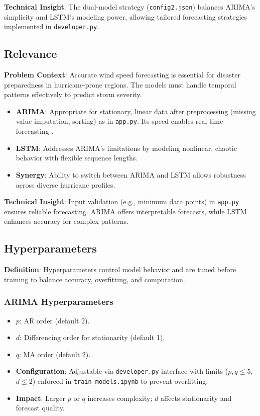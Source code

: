 \textbf{Technical Insight}: The dual-model strategy (\texttt{config2.json}) balances ARIMA’s simplicity and LSTM’s modeling power, allowing tailored forecasting strategies implemented in \texttt{developer.py}.

\subsection{Relevance}

\textbf{Problem Context}: Accurate wind speed forecasting is essential for disaster preparedness in hurricane-prone regions. The models must handle temporal patterns effectively to predict storm severity.

\begin{itemize}
	\item \textbf{ARIMA}: Appropriate for stationary, linear data after preprocessing (missing value imputation, sorting) as in \texttt{app.py}. Its speed enables real-time forecasting \cite{HyndmanAthanasopoulos2021}.
	\item \textbf{LSTM}: Addresses ARIMA’s limitations by modeling nonlinear, chaotic behavior with flexible sequence lengths.
	\item \textbf{Synergy}: Ability to switch between ARIMA and LSTM allows robustness across diverse hurricane profiles.
\end{itemize}

\textbf{Technical Insight}: Input validation (e.g., minimum data points) in \texttt{app.py} ensures reliable forecasting. ARIMA offers interpretable forecasts, while LSTM enhances accuracy for complex patterns.

\subsection{Hyperparameters}

\textbf{Definition}: Hyperparameters control model behavior and are tuned before training to balance accuracy, overfitting, and computation.

\subsubsection{ARIMA Hyperparameters}

\begin{itemize}
	\item $p$: AR order (default 2).
	\item $d$: Differencing order for stationarity (default 1).
	\item $q$: MA order (default 2).
	\item \textbf{Configuration}: Adjustable via \texttt{developer.py} interface with limits ($p, q \leq 5$, $d \leq 2$) enforced in \texttt{train\_models.ipynb} to prevent overfitting.
	\item \textbf{Impact}: Larger $p$ or $q$ increases complexity; $d$ affects stationarity and forecast quality.
\end{itemize}

